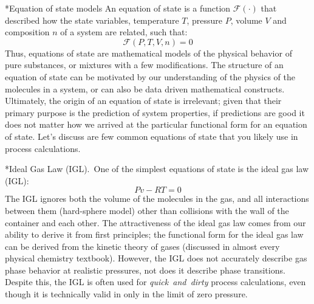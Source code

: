\documentclass[11pt]{article}
\makeatletter
\theoremstyle{definition}
\renewcommand\subsection{\@startsection
	{subsection}{2}{0mm}
	{-0.05in}
	{0.5\baselineskip}
	{\normalfont\normalsize\bfseries}}
\renewcommand\subsubsection{\@startsection
	{subsubsection}{2}{0mm}
	{-0.05in}
	{-0.5\baselineskip}
	{\normalfont\normalsize\bfseries}}
\makeatother
\begin{document}
\subsection*{Equation of state models}
An equation of state is a function $\mathcal{F}(\cdot)$ that described how the state variables, temperature $T$, pressure $P$, volume $V$ and composition $n$
of a system are related, such that:
\begin{equation}
\mathcal{F}\left(P,T,V,n\right) = 0
\end{equation}
Thus, equations of state are mathematical models of the physical behavior of pure substances, or mixtures with a few modifications.
The structure of an equation of state can be motivated by our understanding of the physics of the molecules in a system, or can also be data driven mathematical constructs.
Ultimately, the origin of an equation of state is irrelevant; given that their primary purpose is the prediction of system properties, if predictions are good it does not
matter how we arrived at the particular functional form for an equation of state. Let's discuss are few common equations of state that you likely use in process
calculations.

\subsubsection*{Ideal Gas Law (IGL).}~One of the simplest equations of state is the ideal gas law (IGL):
\begin{equation}
  Pv-RT = 0
\end{equation}
The IGL ignores both the volume of the molecules in the gas, and all interactions between them (hard-sphere model)
other than collisions with the wall of the container and each other.
The attractiveness of the ideal gas law comes from our ability to derive it from first principles;
the functional form for the ideal gas law can be derived from the kinetic theory of gases (discussed in almost every physical chemistry textbook).
However, the IGL does not accurately describe gas phase behavior at realistic pressures, not does it describe phase transitions.
Despite this, the IGL is often used for \textit{quick~and~dirty} process calculations, even though it is technically valid in only in the
limit of zero pressure.

\end{document}
